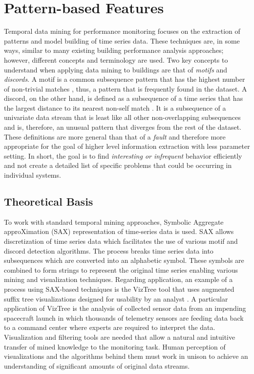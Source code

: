 \chapter{Pattern-based Features}
\label{sec:patternbasedfeatures}

Temporal data mining for performance monitoring focuses on the extraction of patterns and model building of time series data. These techniques are, in some ways, similar to many existing building performance analysis approaches; however, different concepts and terminology are used. Two key concepts to understand when applying data mining to buildings are that of \emph{motifs} and \emph{discords}. A motif is a common subsequence pattern that has the highest number of non-trivial matches \citep{patel_mining_2002}, thus, a pattern that is frequently found in the dataset. A discord, on the other hand, is defined as a subsequence of a time series that has the largest distance to its nearest non-self match \citep{keogh_hot_2005}. It is a subsequence of a univariate data stream that is least like all other non-overlapping subsequences and is, therefore, an unusual pattern that diverges from the rest of the dataset. These definitions are more general than that of a \emph{fault} and therefore more appropriate for the goal of higher level information extraction with less parameter setting. In short, the goal is to find \emph{interesting or infrequent} behavior efficiently and not create a detailed list of specific problems that could be occurring in individual systems.

\section{Theoretical Basis}
\label{sec:patternbasedtheory}

To work with standard temporal mining approaches, Symbolic Aggregate approXimation (SAX) representation of time-series data \citep{lin_symbolic_2003} is used. SAX allows discretization of time series data which facilitates the use of various motif and discord detection algorithms. The process breaks time series data into subsequences which are converted into an alphabetic symbol. These symbols are combined to form strings to represent the original time series enabling various mining and visualization techniques. Regarding application, an example of a process using SAX-based techniques is the VizTree tool that uses augmented suffix tree visualizations designed for usability by an analyst \citep{lin_visually_2004}. A particular application of VizTree is the analysis of collected sensor data from an impending spacecraft launch in which thousands of telemetry sensors are feeding data back to a command center where experts are required to interpret the data. Visualization and filtering tools are needed that allow a natural and intuitive transfer of mined knowledge to the monitoring task. Human perception of visualizations and the algorithms behind them must work in unison to achieve an understanding of significant amounts of original data streams. 


